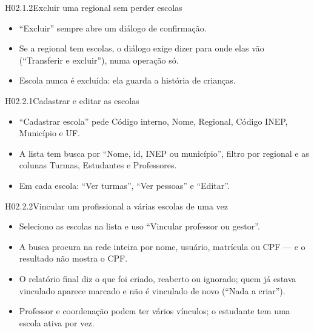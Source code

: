 \begin{historia}{H02.1.2}{Excluir uma regional sem perder escolas}{\pronto}
\aceite
\begin{itemize}
  \item \enquote{Excluir} sempre abre um diálogo de confirmação.
  \item Se a regional tem escolas, o diálogo exige dizer para onde elas vão
    (\enquote{Transferir e excluir}), numa operação só.
  \item Escola nunca é excluída: ela guarda a história de crianças.
\end{itemize}
\end{historia}


\begin{historia}{H02.2.1}{Cadastrar e editar as escolas}{\pronto}
\aceite
\begin{itemize}
  \item \enquote{Cadastrar escola} pede Código interno, Nome, Regional, Código
    INEP, Município e UF.
  \item A lista tem busca por \enquote{Nome, id, INEP ou município}, filtro por
    regional e as colunas Turmas, Estudantes e Professores.
  \item Em cada escola: \enquote{Ver turmas}, \enquote{Ver pessoas} e
    \enquote{Editar}.
\end{itemize}
\end{historia}

\begin{historia}{H02.2.2}{Vincular um profissional a várias escolas de uma vez}{\pronto}
\aceite
\begin{itemize}
  \item Seleciono as escolas na lista e uso \enquote{Vincular professor ou
    gestor}.
  \item A busca procura na rede inteira por nome, usuário, matrícula ou CPF ---
    e o resultado não mostra o CPF.
  \item O relatório final diz o que foi criado, reaberto ou ignorado; quem já
    estava vinculado aparece marcado e não é vinculado de novo (\enquote{Nada
    a criar}).
  \item Professor e coordenação podem ter vários vínculos; o estudante tem uma
    escola ativa por vez.
\end{itemize}
\end{historia}

